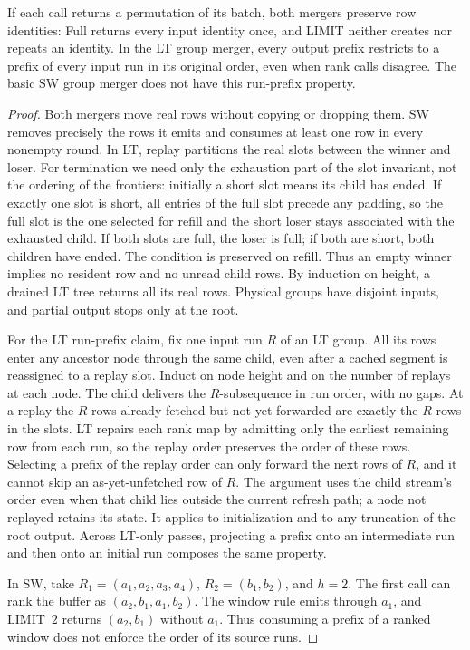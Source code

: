 \begin{proposition}
If each call returns a permutation of its batch, both mergers preserve row identities: Full returns every input identity once, and \textsf{LIMIT} neither creates nor repeats an identity. In the LT group merger, every output prefix restricts to a prefix of every input run in its original order, even when rank calls disagree. The basic SW group merger does not have this run-prefix property.
\end{proposition}
\begin{proof}
Both mergers move real rows without copying or dropping them. SW removes precisely the rows it emits and consumes at least one row in every nonempty round. In LT, replay partitions the real slots between the winner and loser. For termination we need only the exhaustion part of the slot invariant, not the ordering of the frontiers: initially a short slot means its child has ended. If exactly one slot is short, all entries of the full slot precede any padding, so the full slot is the one selected for refill and the short loser stays associated with the exhausted child. If both slots are full, the loser is full; if both are short, both children have ended. The condition is preserved on refill. Thus an empty winner implies no resident row and no unread child rows. By induction on height, a drained LT tree returns all its real rows. Physical groups have disjoint inputs, and partial output stops only at the root.

For the LT run-prefix claim, fix one input run $R$ of an LT group. All its rows enter any ancestor node through the same child, even after a cached segment is reassigned to a replay slot. Induct on node height and on the number of replays at each node. The child delivers the $R$-subsequence in run order, with no gaps. At a replay the $R$-rows already fetched but not yet forwarded are exactly the $R$-rows in the slots. LT repairs each rank map by admitting only the earliest remaining row from each run, so the replay order preserves the order of these rows. Selecting a prefix of the replay order can only forward the next rows of $R$, and it cannot skip an as-yet-unfetched row of $R$. The argument uses the child stream's order even when that child lies outside the current refresh path; a node not replayed retains its state. It applies to initialization and to any truncation of the root output. Across LT-only passes, projecting a prefix onto an intermediate run and then onto an initial run composes the same property.

In SW, take $R_1=(a_1,a_2,a_3,a_4)$, $R_2=(b_1,b_2)$, and $h=2$. The first call can rank the buffer as $(a_2,b_1,a_1,b_2)$. The window rule emits through $a_1$, and \textsf{LIMIT}~$2$ returns $(a_2,b_1)$ without $a_1$. Thus consuming a prefix of a ranked window does not enforce the order of its source runs.
\end{proof}

